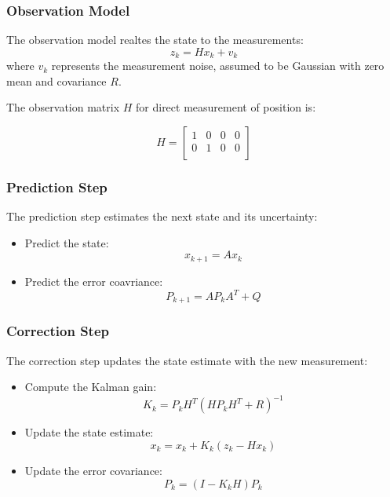 \documentclass{beamer}
\begin{document}
\begin{frame}
    \frametitle{Observation Model}
    The observation model realtes the state to the measurements:
    \begin{equation*}
        z_{k}=Hx_{k}+v_{k}
    \end{equation*}
    where \(v_{k}\) represents the measurement noise, assumed to be Gaussian with zero mean and
    covariance \(R\).

    The observation matrix \(H\) for direct measurement of position is:

    \begin{equation*}
        H = \begin{bmatrix}
            1 & 0 & 0 & 0 \\
            0 & 1 & 0 & 0 \\
        \end{bmatrix}
    \end{equation*}

\end{frame}

\begin{frame}
    \frametitle{Prediction Step}

    The prediction step estimates the next state and its uncertainty:

    \begin{itemize}
        \item Predict the state:
              \begin{equation}
                  x_{k+1}=Ax_{k}
              \end{equation}

        \item Predict the error coavriance:
              \begin{equation}
                  P_{k+1}=AP_{k}A^{T}+Q
              \end{equation}
    \end{itemize}
\end{frame}

\begin{frame}
    \frametitle{Correction Step}
    The correction step updates the state estimate with the new measurement:
    \begin{itemize}
        \item Compute the Kalman gain:
              \begin{equation}
                  K_{k} = P_{k}H^{T}(HP_{k}H^{T}+R)^{-1}
              \end{equation}
        \item Update the state estimate:
              \begin{equation}
                  x_{k} = x_{k}+K_{k}(z_{k}-Hx_{k})
              \end{equation}
        \item Update the error covariance:
              \begin{equation}
                  P_{k} = (I-K_{k}H)P_{k}
              \end{equation}
    \end{itemize}
\end{frame}
\end{document}
